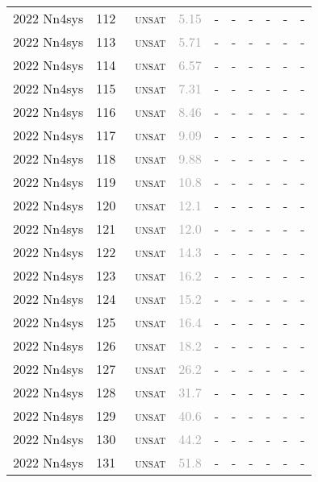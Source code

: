\begin{center}
{\begin{longtable}{@{}llllllllll@{}}
2022 Nn4sys & 112 & ~\textsc{unsat} & \textcolor{darkgray}{5.15} & - & - & - & - & - & - \\
2022 Nn4sys & 113 & ~\textsc{unsat} & \textcolor{darkgray}{5.71} & - & - & - & - & - & - \\
2022 Nn4sys & 114 & ~\textsc{unsat} & \textcolor{darkgray}{6.57} & - & - & - & - & - & - \\
2022 Nn4sys & 115 & ~\textsc{unsat} & \textcolor{darkgray}{7.31} & - & - & - & - & - & - \\
2022 Nn4sys & 116 & ~\textsc{unsat} & \textcolor{darkgray}{8.46} & - & - & - & - & - & - \\
2022 Nn4sys & 117 & ~\textsc{unsat} & \textcolor{darkgray}{9.09} & - & - & - & - & - & - \\
2022 Nn4sys & 118 & ~\textsc{unsat} & \textcolor{darkgray}{9.88} & - & - & - & - & - & - \\
2022 Nn4sys & 119 & ~\textsc{unsat} & \textcolor{darkgray}{10.8} & - & - & - & - & - & - \\
2022 Nn4sys & 120 & ~\textsc{unsat} & \textcolor{darkgray}{12.1} & - & - & - & - & - & - \\
2022 Nn4sys & 121 & ~\textsc{unsat} & \textcolor{darkgray}{12.0} & - & - & - & - & - & - \\
2022 Nn4sys & 122 & ~\textsc{unsat} & \textcolor{darkgray}{14.3} & - & - & - & - & - & - \\
2022 Nn4sys & 123 & ~\textsc{unsat} & \textcolor{darkgray}{16.2} & - & - & - & - & - & - \\
2022 Nn4sys & 124 & ~\textsc{unsat} & \textcolor{darkgray}{15.2} & - & - & - & - & - & - \\
2022 Nn4sys & 125 & ~\textsc{unsat} & \textcolor{darkgray}{16.4} & - & - & - & - & - & - \\
2022 Nn4sys & 126 & ~\textsc{unsat} & \textcolor{darkgray}{18.2} & - & - & - & - & - & - \\
2022 Nn4sys & 127 & ~\textsc{unsat} & \textcolor{darkgray}{26.2} & - & - & - & - & - & - \\
2022 Nn4sys & 128 & ~\textsc{unsat} & \textcolor{darkgray}{31.7} & - & - & - & - & - & - \\
2022 Nn4sys & 129 & ~\textsc{unsat} & \textcolor{darkgray}{40.6} & - & - & - & - & - & - \\
2022 Nn4sys & 130 & ~\textsc{unsat} & \textcolor{darkgray}{44.2} & - & - & - & - & - & - \\
2022 Nn4sys & 131 & ~\textsc{unsat} & \textcolor{darkgray}{51.8} & - & - & - & - & - & - \\

\end{longtable}}
\end{center}
